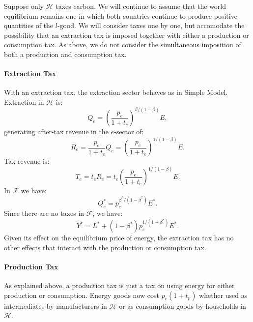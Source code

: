 \documentclass[notitlepage,12pt]{article}
\begin{document}
Suppose only $\mathcal{H}$ taxes carbon. We will continue to assume that the
world equilibrium remains one in which both countries continue to produce
positive quantities of the $l$-good. We will consider taxes one by one, but
accomodate the possibility that an extraction tax is imposed together with
either a production or consumption tax. As above, we do not consider the
simultaneous imposition of both a production and consumption tax.

\paragraph{Extraction Tax}

With an extraction tax, the extraction sector behaves as in Simple Model.
Extraction in $\mathcal{H}$ is:%
\begin{equation*}
Q_{e}=\left( \frac{p_{e}}{1+t_{e}}\right) ^{\beta /(1-\beta )}E,
\end{equation*}%
generating after-tax revenue in the $e$-sector of:%
\begin{equation*}
R_{e}=\frac{p_{e}}{1+t_{e}}Q_{e}=\left( \frac{p_{e}}{1+t_{e}}\right)
^{1/(1-\beta )}E.
\end{equation*}%
Tax revenue is:%
\begin{equation*}
T_{e}=t_{e}R_{e}=t_{e}\left( \frac{p_{e}}{1+t_{e}}\right) ^{1/(1-\beta )}E.
\end{equation*}%
In $\mathcal{F}$ we have:%
\begin{equation*}
Q_{e}^{\ast }=p_{e}^{\beta ^{\ast }/(1-\beta ^{\ast })}E^{\ast }.
\end{equation*}%
Since there are no taxes in $\mathcal{F}$, we have:%
\begin{equation}
Y^{\ast }=L^{\ast }+\left( 1-\beta ^{\ast }\right) p_{e}^{1/(1-\beta ^{\ast
})}E^{\ast }.  \label{Y star}
\end{equation}%
Given its effect on the equilibrium price of energy, the extraction tax has
no other effects that interact with the production or consumption tax.

\paragraph{Production Tax}

As explained above, a production tax is just a tax on using energy for
either production or consumption. Energy goods now cost $p_{e}(1+t_{p})$
whether used as intermediates by manufacturers in $\mathcal{H}$ or as
consumption goods by households in $\mathcal{H}$.
\end{document}
